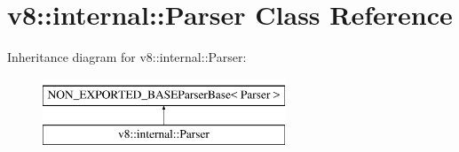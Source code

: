 \hypertarget{classv8_1_1internal_1_1Parser}{}\section{v8\+:\+:internal\+:\+:Parser Class Reference}
\label{classv8_1_1internal_1_1Parser}
Inheritance diagram for v8\+:\+:internal\+:\+:Parser\+:\begin{figure}[H]
\begin{center}
\leavevmode
\includegraphics[height=2.000000cm]{classv8_1_1internal_1_1Parser}
\end{center}
\end{figure}
